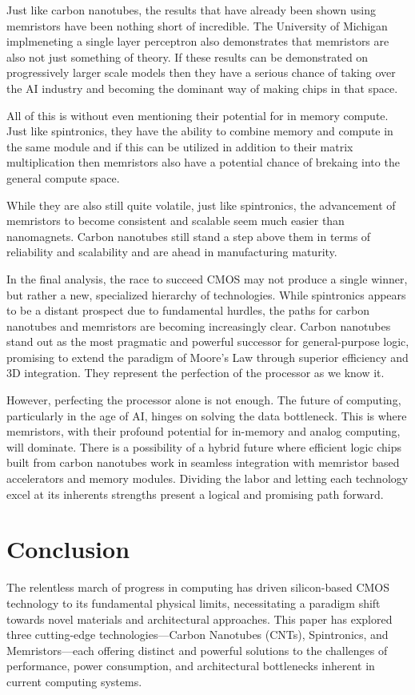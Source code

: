 \documentclass[sigconf]{acmart}
\begin{document}
Just like carbon nanotubes, the results that have already been shown using memristors have 
been nothing short of incredible. The University of Michigan implmeneting a single layer 
perceptron also demonstrates that memristors are also not just something of theory. If these 
results can be demonstrated on progressively larger scale models then they have a serious 
chance of taking over the AI industry and becoming the dominant way of making chips in
that space. 

All of this is without even mentioning their potential for in memory compute. Just like 
spintronics, they have the ability to combine memory and compute in the same module and 
if this can be utilized in addition to their matrix multiplication then memristors also 
have a potential chance of brekaing into the general compute space. 

While they are also still quite volatile, just like spintronics, the advancement of 
memristors to become consistent and scalable seem much easier than nanomagnets. Carbon 
nanotubes still stand a step above them in terms of reliability and scalability and are 
ahead in manufacturing maturity. 

In the final analysis, the race to succeed CMOS may not produce a single winner, 
but rather a new, specialized hierarchy of technologies. While spintronics appears to 
be a distant prospect due to fundamental hurdles, the paths for carbon nanotubes and 
memristors are becoming increasingly clear. Carbon nanotubes stand out as the most 
pragmatic and powerful successor for general-purpose logic, promising to extend the 
paradigm of Moore's Law through superior efficiency and 3D integration. They represent 
the perfection of the processor as we know it.

However, perfecting the processor alone is not enough. The future of computing, 
particularly in the age of AI, hinges on solving the data bottleneck. This is where 
memristors, with their profound potential for in-memory and analog computing, will 
dominate. There is a possibility of a hybrid future where efficient logic chips built 
from carbon nanotubes work in seamless integration with memristor based accelerators 
and memory modules. Dividing the labor and letting each technology excel at its 
inherents strengths present a logical and promising path forward. 


\section{Conclusion}
The relentless march of progress in computing has driven 
silicon-based CMOS technology to its fundamental physical limits, 
necessitating a paradigm shift towards novel materials and 
architectural approaches. This paper has explored three 
cutting-edge technologies—Carbon Nanotubes (CNTs), Spintronics, 
and Memristors—each offering distinct and powerful solutions to 
the challenges of performance, power consumption, and 
architectural bottlenecks inherent in current computing systems.
\end{document}

